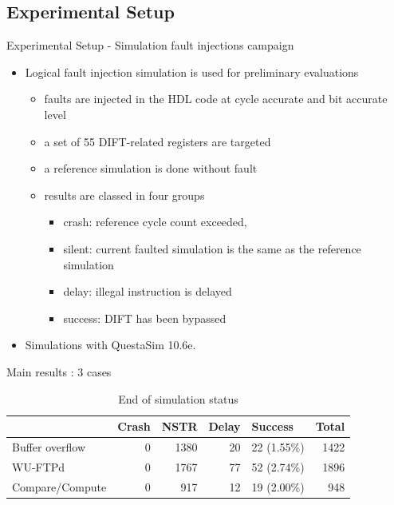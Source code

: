 \subsection{Experimental Setup}
\begin{frame}{Experimental Setup - Simulation fault injections campaign}
    \begin{itemize}
        \justifying
        \item Logical fault injection simulation is used for preliminary evaluations
              \begin{itemize}
                  \justifying
                  \item faults are injected in the HDL code at cycle accurate and bit accurate level
                  \item a set of 55 DIFT-related registers are targeted
                  \item a reference simulation is done without fault
                  \item results are classed in four groups
                        \begin{itemize}
                            \justifying
                            \item crash: reference cycle count exceeded,
                            \item silent: current faulted simulation is the same as the reference simulation
                            \item delay: illegal instruction is delayed
                            \item success: DIFT has been bypassed
                        \end{itemize}
              \end{itemize}
        \item Simulations with QuestaSim 10.6e.
    \end{itemize}
\end{frame}
\begin{frame}{Main results : 3 cases}
    \begin{table}[H]
        \centering
        \caption{End of simulation status}
        \label{table:end_sim_by_status}
        \begin{tabular}{lrrrlr}
            \toprule
                            & Crash & NSTR & Delay & Success     & Total \\
            \midrule
            Buffer overflow & 0     & 1380 & 20    & 22 (1.55\%) & 1422  \\
            WU-FTPd         & 0     & 1767 & 77    & 52 (2.74\%) & 1896  \\
            Compare/Compute & 0     & 917  & 12    & 19 (2.00\%) & 948   \\
            \bottomrule
        \end{tabular}
    \end{table}
\end{frame}

